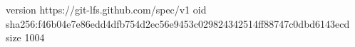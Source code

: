 version https://git-lfs.github.com/spec/v1
oid sha256:f46b04e7e86edd4dfb754d2ec56e9453c029824342514ff88747c0dbd6143ecd
size 1004
